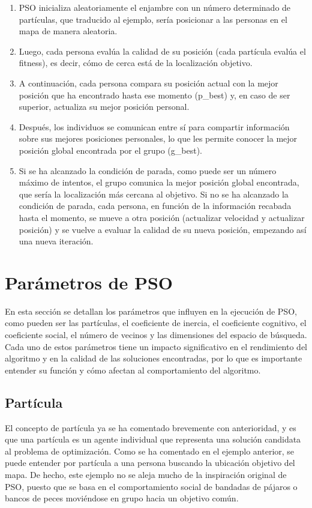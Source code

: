 \begin{enumerate}
    \item PSO inicializa aleatoriamente el enjambre con un número determinado de partículas, que traducido al ejemplo, sería posicionar a las personas en el mapa de manera aleatoria.
    \item Luego, cada persona evalúa la calidad de su posición (cada partícula evalúa el fitness), es decir, cómo de cerca está de la localización objetivo.
    \item A continuación, cada persona compara su posición actual con la mejor posición que ha encontrado hasta ese momento (p\_best) y, en caso de ser superior, actualiza su mejor posición personal.
    \item Después, los individuos se comunican entre sí para compartir información sobre sus mejores posiciones personales, lo que les permite conocer la mejor posición global encontrada por el grupo (g\_best).
    \item Si se ha alcanzado la condición de parada, como puede ser un número máximo de intentos, el grupo comunica la mejor posición global encontrada, que sería la localización más cercana al objetivo. Si no se ha alcanzado la condición de parada, cada persona, en función de la información recabada hasta el momento, se mueve a otra posición (actualizar velocidad y actualizar posición) y se vuelve a evaluar la calidad de su nueva posición, empezando así una nueva iteración.
\end{enumerate}

\section{Parámetros de PSO}

En esta sección se detallan los parámetros que influyen en la ejecución de PSO, como pueden ser las partículas, el coeficiente de inercia, el coeficiente cognitivo, el coeficiente social, el número de vecinos y las dimensiones del espacio de búsqueda. Cada uno de estos parámetros tiene un impacto significativo en el rendimiento del algoritmo y en la calidad de las soluciones encontradas, por lo que es importante entender su función y cómo afectan al comportamiento del algoritmo.

\subsection{Partícula}

El concepto de partícula ya se ha comentado brevemente con anterioridad, y es que una partícula es un agente individual que representa una solución candidata al problema de optimización. Como se ha comentado en el ejemplo anterior, se puede entender por partícula a una persona buscando la ubicación objetivo del mapa. De hecho, este ejemplo no se aleja mucho de la inspiración original de PSO, puesto que se basa en el comportamiento social de bandadas de pájaros o bancos de peces moviéndose en grupo hacia un objetivo común.


